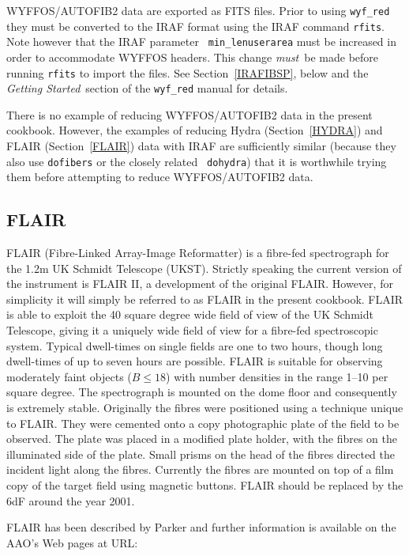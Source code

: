 \documentclass[twoside,11pt]{article}
\begin{document}
WYFFOS/AUTOFIB2 data are exported as FITS files.  Prior to using
{\tt wyf\_red} they must be converted to the IRAF format using the
IRAF command {\tt rfits}.  Note however that the IRAF parameter {\tt
min\_lenuserarea} must be increased in order to accommodate WYFFOS
headers.  This change {\it must}\, be made before running {\tt rfits}
to import the files.  See Section~\ref{IRAFIBSP}, below and the {\it
Getting Started}\, section of the  {\tt wyf\_red} manual for details.

There is no example of reducing WYFFOS/AUTOFIB2 data in the present
cookbook.  However, the examples of reducing Hydra (Section~\ref{HYDRA})
and FLAIR (Section~\ref{FLAIR}) data with IRAF are sufficiently similar
(because they also use {\tt dofibers} or the closely related {\tt
dohydra}) that it is worthwhile trying them before attempting to reduce
WYFFOS/AUTOFIB2 data.

\subsection{\label{FLAIR_I}FLAIR}

FLAIR (Fibre-Linked Array-Image Reformatter) is a fibre-fed spectrograph
for the 1.2m UK Schmidt Telescope (UKST).  Strictly speaking the current
version of the instrument is FLAIR II, a development of the original
FLAIR.  However, for simplicity it will simply be referred to as FLAIR
in the present cookbook.  FLAIR is able to exploit the 40 square degree
wide field of view of the UK Schmidt Telescope, giving it a uniquely wide
field of view for a fibre-fed spectroscopic system.  Typical dwell-times on
single fields are one to two hours, though long dwell-times of up to seven
hours are possible.  FLAIR is suitable for observing moderately faint
objects ($B \leq 18$) with number densities in the range 1--10 per square
degree.  The spectrograph is mounted on the dome floor and consequently is
extremely stable.  Originally the fibres were positioned using a
technique unique to FLAIR.  They were cemented onto a copy photographic
plate of the field to be observed.  The plate was placed in a modified
plate holder, with the fibres on the illuminated side of the plate.  Small
prisms on the head of the fibres directed the incident light along the
fibres.  Currently the fibres are mounted on top of a film copy of the
target field using magnetic buttons.  FLAIR should be replaced by the
6dF\cite{PARKER98} around the year 2001.

FLAIR has been described by Parker\cite{PARKER97A} and further information
is available on the AAO's Web pages at URL:
\end{document}
